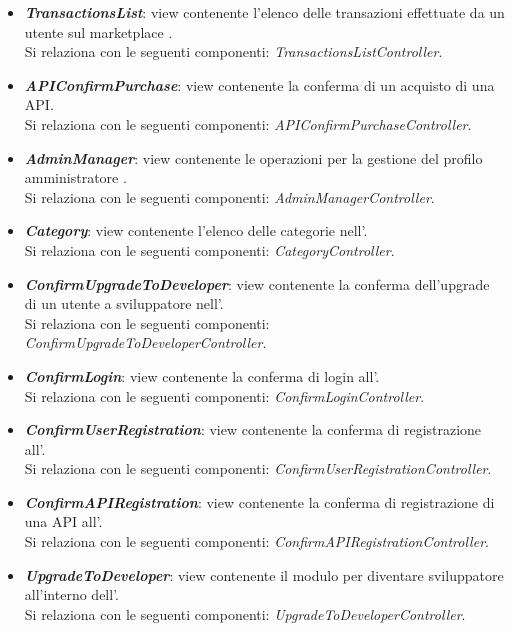 \begin{itemize}
\begin{itemize}
		\item \textbf{\textit{TransactionsList}}: view contenente l'elenco delle transazioni effettuate da un utente sul marketplace \progetto.\\
		Si relaziona con le seguenti componenti: \textit{TransactionsListController}.
				
		\item \textbf{\textit{APIConfirmPurchase}}: view contenente la conferma di un acquisto di una API.\\
		Si relaziona con le seguenti componenti: \textit{APIConfirmPurchaseController}.
				
		\item \textbf{\textit{AdminManager}}: view contenente le operazioni per la gestione del profilo amministratore \progetto.\\
		Si relaziona con le seguenti componenti: \textit{AdminManagerController}.
		
		\item \textbf{\textit{Category}}: view contenente l'elenco delle categorie nell'\progetto.\\
		Si relaziona con le seguenti componenti: \textit{CategoryController}.
		
		\item \textbf{\textit{ConfirmUpgradeToDeveloper}}: view contenente la conferma dell'upgrade di un utente a sviluppatore nell'\progetto.\\
		Si relaziona con le seguenti componenti: \textit{ConfirmUpgradeToDeveloperController}.
		
		\item \textbf{\textit{ConfirmLogin}}: view contenente la conferma di login all'\progetto.\\
		Si relaziona con le seguenti componenti: \textit{ConfirmLoginController}.
		
		\item \textbf{\textit{ConfirmUserRegistration}}: view contenente la conferma di registrazione all'\progetto.\\
		Si relaziona con le seguenti componenti: \textit{ConfirmUserRegistrationController}.
		
		\item \textbf{\textit{ConfirmAPIRegistration}}: view contenente la conferma di registrazione di una API all'\progetto.\\
		Si relaziona con le seguenti componenti: \textit{ConfirmAPIRegistrationController}.
		
		\item \textbf{\textit{UpgradeToDeveloper}}: view contenente il modulo per diventare sviluppatore all'interno dell'\progetto.\\
		Si relaziona con le seguenti componenti: \textit{UpgradeToDeveloperController}.
		

\end{itemize}
\end{itemize}
